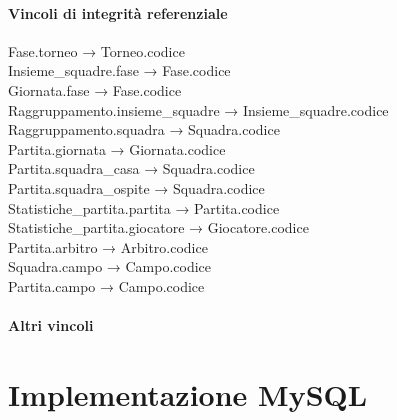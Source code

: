 \documentclass[11pt, openany]{article}
\theoremstyle{definition}
\theoremstyle{plain}
\theoremstyle{remark}
\begin{document}
			\begin{tcolorbox}[width=\textwidth, colback={Cornsilk2}]
				\subsection{Vincoli di integrità referenziale}
				Fase.torneo → Torneo.codice\\
				Insieme\_squadre.fase → Fase.codice\\
				Giornata.fase → Fase.codice\\
				Raggruppamento.insieme\_squadre → Insieme\_squadre.codice\\
				Raggruppamento.squadra → Squadra.codice\\
				Partita.giornata → Giornata.codice\\
				Partita.squadra\_casa → Squadra.codice\\
				Partita.squadra\_ospite → Squadra.codice\\
				Statistiche\_partita.partita → Partita.codice\\
				Statistiche\_partita.giocatore → Giocatore.codice\\
				Partita.arbitro → Arbitro.codice\\
				Squadra.campo → Campo.codice\\
				Partita.campo → Campo.codice
			\end{tcolorbox}
			
			\begin{tcolorbox}[width=\textwidth, colback={Cornsilk2}]
				\subsection{Altri vincoli}
			\end{tcolorbox}
			
	\part{Implementazione MySQL}
\end{document}
